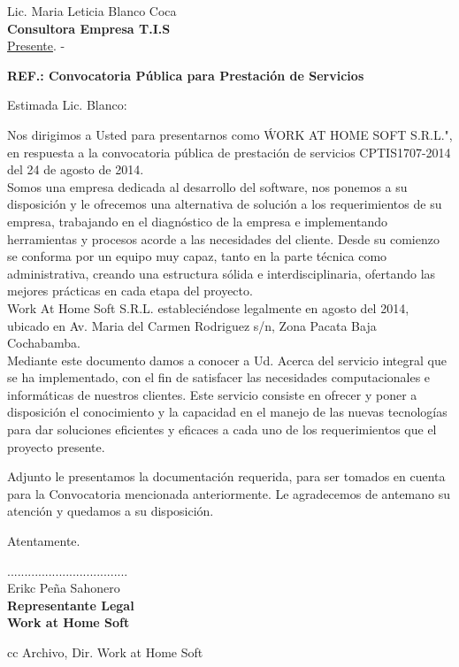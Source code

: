 \documentclass[letterpaper,12pt]{letter}
\begin{document}
\date {Cochabamba, \today}
\begin{letter}{Lic. Maria Leticia Blanco Coca \\ {\bf Consultora Empresa T.I.S} \\ \underline {Presente}. -}

\begin{center}
	\opening{ \textbf{ REF.: Convocatoria Pública para Prestación de Servicios }}
\end{center}

Estimada Lic. Blanco:

Nos dirigimos a Usted para presentarnos como \' WORK AT HOME SOFT S.R.L.", en respuesta a la convocatoria pública de prestación de servicios CPTIS1707-2014 del 24 de agosto de 2014.\\

Somos una empresa dedicada al desarrollo del software, nos ponemos a su disposición y le ofrecemos una alternativa de solución a los requerimientos de su empresa, trabajando en el diagnóstico de la empresa e implementando herramientas y procesos acorde a las necesidades del cliente. Desde su comienzo se conforma por un equipo muy capaz, tanto en la parte técnica como administrativa, creando una estructura sólida e interdisciplinaria, ofertando las mejores prácticas en cada etapa del proyecto.\\

Work At Home Soft S.R.L. estableciéndose legalmente en agosto del 2014, ubicado en Av. Maria del Carmen Rodriguez s/n, Zona Pacata Baja Cochabamba.\\

Mediante este documento damos a conocer a Ud. Acerca del servicio integral que se ha implementado, con el fin de satisfacer las necesidades computacionales e informáticas de nuestros clientes. Este servicio consiste en ofrecer y poner a disposición el conocimiento y la capacidad en el manejo de las nuevas tecnologías para dar soluciones eficientes y eficaces a cada uno de los requerimientos que el proyecto presente. 

Adjunto le presentamos la documentación requerida, para ser tomados en cuenta para la Convocatoria mencionada anteriormente. Le agradecemos de antemano su atención y quedamos a su disposición.
 
Atentamente.

\vspace{0.50cm}

\begin{center}
...................................\\
Erikc Peña Sahonero\\
{\bfseries Representante Legal \\ Work at Home Soft}
\end{center}
\vspace{0.25cm}
cc Archivo, Dir. Work at Home Soft
\end{letter}
\end{document}
